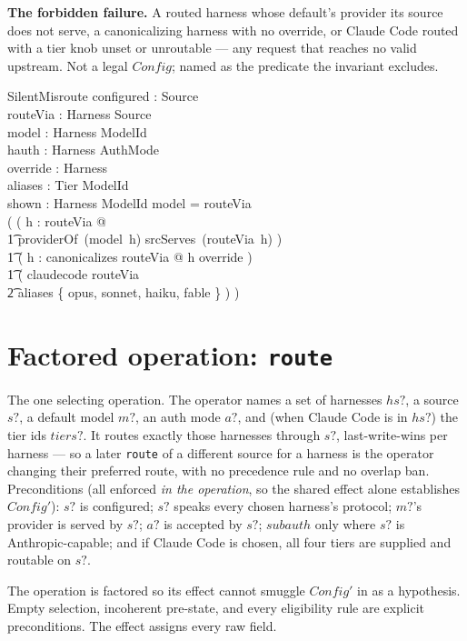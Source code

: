 \documentclass{article}
\begin{document}
\textbf{The forbidden failure.} A routed harness whose default's provider its
source does not serve, a canonicalizing harness with no override, or Claude Code
routed with a tier knob unset or unroutable --- any request that reaches no valid
upstream. Not a legal $Config$; named as the predicate the invariant excludes.

\begin{schema}{SilentMisroute}
	configured : \power Source \\
	routeVia : Harness \pfun Source \\
	model : Harness \pfun ModelId \\
	hauth : Harness \pfun AuthMode \\
	override : \power Harness \\
	aliases : Tier \pfun ModelId \\
	shown : Harness \pfun \power ModelId
	\where
	\dom model = \dom routeVia \\
	( ( \exists h : \dom routeVia @ \\
	\t1 providerOf~(model~h) \notin srcServes~(routeVia~h) ) \lor \\
	\t1 ( \exists h : canonicalizes \cap \dom routeVia @ h \notin override ) \lor \\
	\t1 ( claudecode \in \dom routeVia \land \\
	\t2 \dom aliases \neq \{ opus, sonnet, haiku, fable \} ) )
\end{schema}

\section{Factored operation: \texttt{route}}

The one selecting operation. The operator names a set of harnesses $hs?$, a
source $s?$, a default model $m?$, an auth mode $a?$, and (when Claude Code is in
$hs?$) the tier ids $tiers?$. It routes exactly those harnesses through $s?$,
last-write-wins per harness --- so a later \texttt{route} of a different source
for a harness is the operator changing their preferred route, with no precedence
rule and no overlap ban. Preconditions (all enforced \emph{in the operation}, so
the shared effect alone establishes $Config'$):
$s?$ is configured; $s?$ speaks every chosen harness's protocol; $m?$'s provider
is served by $s?$; $a?$ is accepted by $s?$; $subauth$ only where $s?$ is
Anthropic-capable; and if Claude Code is chosen, all four tiers are supplied and
routable on $s?$.

The operation is factored so its effect cannot smuggle $Config'$ in as a
hypothesis.  Empty selection, incoherent pre-state, and every eligibility rule
are explicit preconditions.  The effect assigns every raw field.
\end{document}
